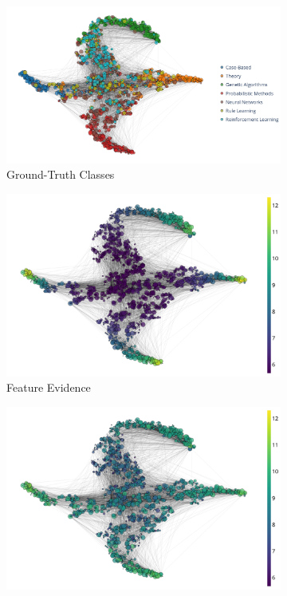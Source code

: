 \begin{figure}[!h]
    \centering
	\begin{subfigure}[t]{\textwidth}
	    \centering
		\includegraphics[height=0.25\textheight]{sections/009_neurips2021/resources/loc-classes.png}
		\caption{Ground-Truth Classes} 
		\label{subfig:loc-clean-classes}
	\end{subfigure}
	\begin{subfigure}[t]{\textwidth}
	    \centering
		\includegraphics[height=0.25\textheight]{sections/009_neurips2021/resources/loc-ft-evidence.png}
		\caption{Feature Evidence} 
		\label{subfig:loc-clean-feature-evidence}
	\end{subfigure}
	\begin{subfigure}[t]{\textwidth}
	    \centering
		\includegraphics[height=0.25\textheight]{sections/009_neurips2021/resources/loc-evidence.png}

\end{subfigure}
\end{figure}
